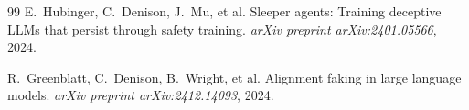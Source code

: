 \documentclass[11pt]{article}
\begin{document}
\begin{thebibliography}{99}
E.~Hubinger, C.~Denison, J.~Mu, et al.
\newblock Sleeper agents: Training deceptive LLMs that persist through safety
training.
\newblock \emph{arXiv preprint arXiv:2401.05566}, 2024.

R.~Greenblatt, C.~Denison, B.~Wright, et al.
\newblock Alignment faking in large language models.
\newblock \emph{arXiv preprint arXiv:2412.14093}, 2024.

\end{thebibliography}
\end{document}

